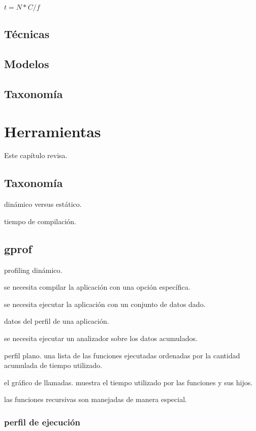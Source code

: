 \documentclass[a4paper]{report}
\begin{document}
\bigskip

$ t = N * C / f $

\section{T\'ecnicas}

\section{Modelos}

\section{Taxonom\'ia}

\chapter{Herramientas}

Este cap\'itulo revisa.

\section{Taxonom\'ia}

din\'amico versus est\'atico.

tiempo de compilaci\'on.

\section{gprof}

profiling din\'amico.

se necesita compilar la aplicaci\'on con una opci\'on espec\'ifica.

se necesita ejecutar la aplicaci\'on con un conjunto de datos dado.

datos del perfil de una aplicaci\'on.

se necesita ejecutar un analizador sobre los datos acumulados.

perfil plano. una lista de las funciones ejecutadas ordenadas por la cantidad
acumulada de tiempo utilizado.

el gr\'afico de llamadas. muestra el tiempo utilizado por las funciones y sus hijos.

las funciones recursivas son manejadas de manera especial.

\subsection{perfil de ejecuci\'on}
\end{document}
